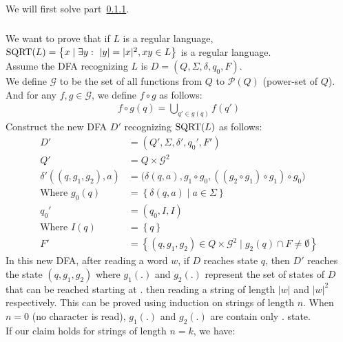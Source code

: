 \documentclass{article}
\numberwithin{equation}{subsection}
\newcommand{\setsubsubsectionnumber}[1]{\setcounter{subsubsection}{#1}\addtocounter{subsubsection}{-1}}
\newcommand{\abs}[1]{\vert #1\vert}
\begin{document}
\subsection{}
We will first solve part~\ref{sec:subsubsection4-2}.
\setsubsubsectionnumber{2}
\subsubsection{}\label{sec:subsubsection4-2}
We want to prove that if \(L\) is a regular language, \(\textup{SQRT}(L) = \left\{x \mid \exists y:\ \abs{y}=\abs{x}^2, xy\in L\right\}\) is a regular language.\\
Assume the DFA recognizing \(L\) is \(D = (Q, \Sigma, \delta, q_0, F)\).\\
We define \(\mathcal{G}\) to be the set of all functions from \(Q\) to \(\mathcal{P}(Q)\) (power-set of \(Q\)). 
And for any \(f, g \in \mathcal{G}\), we define \(f \circ g\) as follows:
\begin{align}
f \circ g(q) = \bigcup_{q' \in g(q)} f(q')
\end{align}
Construct the new DFA \(D'\) recognizing \(\textup{SQRT}(L)\) as follows:
\begin{align}
D' &= (Q', \Sigma, \delta', q_0', F')\\
Q' &= Q \times \mathcal{G}^2\\
\delta'((q, g_1, g_2), a) &= \Big(\delta(q, a), g_1\circ g_0, ((g_2\circ g_1)\circ g_1)\circ g_0\Big)\\
\text{Where }g_0(q) &= \left\{\delta(q, a)\mid a \in \Sigma\right\}\\
q_0' &= (q_0, I, I)\\
\text{Where }I(q) &= \left\{q\right\}\\
F' &= \left\{(q, g_1, g_2) \in Q\times \mathcal{G}^2 \mid g_2(q) \cap F \neq \emptyset\right\}
\end{align}
In this new DFA, after reading a word \(w\), if \(D\) reaches state \(q\), then \(D'\) reaches the state \((q, g_1, g_2)\) where \(g_1(.)\) and \(g_2(.)\) represent the set of states of \(D\) that can be reached starting at \(.\) then reading a string of length \(\abs{w}\) and \(\abs{w}^2\) respectively.
This can be proved using induction on strings of length \(n\).
When \(n=0\) (no character is read), \(g_1(.)\) and \(g_2(.)\) are contain only \(.\) state.\\
If our claim holds for strings of length \(n=k\), we have:
\end{document}
